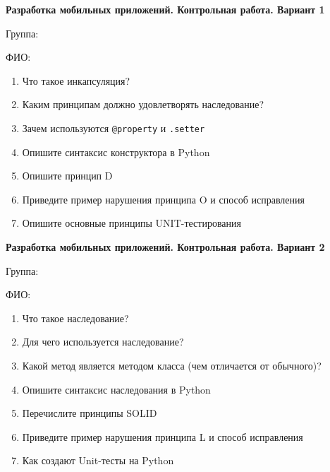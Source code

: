 \documentclass[12pt]{article}
\begin{document}
\begin{minipage}{\textwidth}
\textbf{Разработка мобильных приложений. Контрольная работа. Вариант 1}

Группа: \underline{\hspace{3cm}}

ФИО: \underline{\hspace{10cm}}

\begin{enumerate}
\item Что такое инкапсуляция?
\item Каким принципам должно удовлетворять наследование?
\item Зачем используются \verb|@property| и \verb|.setter|
\item Опишите синтаксис конструктора в Python
\item Опишите принцип D
\item Приведите пример нарушения принципа O и способ исправления
\item Опишите основные принципы UNIT-тестирования

\end{enumerate}
\end{minipage}

\vspace{40pt}\begin{minipage}{\textwidth}
\textbf{Разработка мобильных приложений. Контрольная работа. Вариант 2}

Группа: \underline{\hspace{3cm}}

ФИО: \underline{\hspace{10cm}}

\begin{enumerate}
\item Что такое наследование?
\item Для чего используется наследование?
\item Какой метод является методом класса (чем отличается от обычного)?
\item Опишите синтаксис наследования в Python
\item Перечислите принципы SOLID
\item Приведите пример нарушения принципа L и способ исправления
\item Как создают Unit-тесты на Python

\end{enumerate}
\end{minipage}
\end{document}
